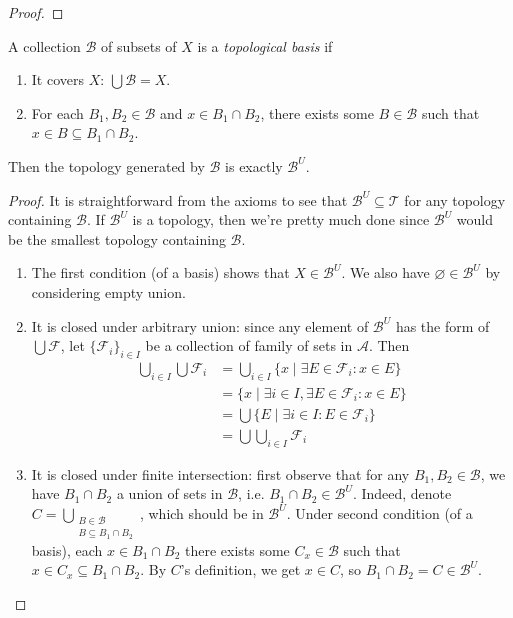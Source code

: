 \documentclass{treatise}
\begin{document}
\begin{shaded}
\begin{proof}
\end{proof}
\begin{lemma} \label{topo-generated-basis}
A collection $\mathcal{B}$ of subsets of $X$ is a \emph{topological basis} if
\begin{enumerate}
    \item It covers $X$: $\bigcup \mathcal{B} = X$.
    \item For each $B_1, B_2 \in \mathcal{B}$ and $x \in B_1 \cap B_2$, there exists some $B \in \mathcal{B}$ such that $x \in B \subseteq B_1 \cap B_2$.
\end{enumerate}
Then the topology generated by $\mathcal{B}$ is exactly $\mathcal{B}^{U}$.
\end{lemma}
\begin{proof}
It is straightforward from the axioms to see that $\mathcal{B}^{U} \subseteq \mathcal{T}$ for any topology containing $\mathcal{B}$. If $\mathcal{B}^{U}$ is a topology, then we're pretty much done since $\mathcal{B}^{U}$ would be the smallest topology containing $\mathcal{B}$.
\begin{enumerate}
    \item The first condition (of a basis) shows that $X \in \mathcal{B}^U$. We also have $\varnothing \in \mathcal{B}^U$ by considering empty union.
    \item It is closed under arbitrary union: since any element of $\mathcal{B}^{U}$ has the form of $\bigcup \mathcal{F}$, let $\{ \mathcal{F}_i \}_{i \in I}$ be a collection of family of sets in $\mathcal{A}$. Then
    \begin{align*}
        \bigcup_{i \in I} \bigcup \mathcal{F}_i & = \bigcup_{i \in I} \{ x \mid \exists E \in \mathcal{F}_i : x \in E \}
        \\
        & = \{ x \mid \exists i \in I, \exists E \in \mathcal{F}_i : x \in E \}
        \\
        & = \bigcup \{ E \mid \exists i \in I: E \in \mathcal{F}_i \}
        \\
        & = \bigcup \bigcup_{i \in I} \mathcal{F}_i
    \end{align*}
    \item It is closed under finite intersection: first observe that for any $B_1, B_2 \in \mathcal{B}$, we have $B_1 \cap B_2$ a union of sets in $\mathcal{B}$, i.e. $B_1 \cap B_2 \in \mathcal{B}^U$. Indeed, denote $C = \bigcup_{\substack{B \in \mathcal{B} \\ B \subseteq B_1 \cap B_2}}$, which should be in $\mathcal{B}^U$. Under second condition (of a basis), each $x \in B_1 \cap B_2$ there exists some $C_x \in \mathcal{B}$ such that $x \in C_x \subseteq B_1 \cap B_2$. By $C$'s definition, we get $x \in C$, so $B_1 \cap B_2 = C \in \mathcal{B}^U$.

\end{enumerate}
\end{proof}
\end{shaded}
\end{document}
